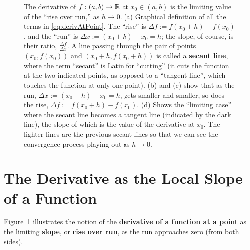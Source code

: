 \begin{figure}[htb]
    \caption[]{The derivative of $f:(a, b) \to \mathbb R$ at $x_0 \in (a, b)$ is the limiting value of the ``rise over run,'' as $h \to 0$. (a) Graphical definition of all the terms in \eqref{eq:derivAtPoint}. The ``rise'' is $\Delta f := f(x_0+h) - f(x_0)$, and the ``run'' is $\Delta x:= (x_0+h) - x_0 = h$; the slope, of course, is their ratio, $\frac{\Delta f}{\Delta x}$. A line passing through the pair of points $(x_0, f(x_0))$ and $(x_0+h, f(x_0 +h))$ is called a \href{https://en.wikipedia.org/wiki/Secant}{\bf secant line}, where the term ``secant'' is Latin for ``cutting'' (it cuts the function at the two indicated points, as opposed to a ``tangent line'', which touches the function at only one point). (b) and (c) show that as the run, $\Delta x := (x_0 + h) - x_0 = h$, gets smaller and smaller, so does the rise, $\Delta f:= f(x_0 +h) - f(x_0)$. (d) Shows the ``limiting case'' where the secant line becomes a tangent line (indicated by the dark line), the slope of which is the value of the derivative at $x_0$. The lighter lines are the previous secant lines so that we can see the convergence process playing out as $h \to 0$.}
    \label{fig:DefDerivativeAtPoint}
\end{figure}

\section{The Derivative as the Local Slope of a Function}

Figure~\ref{fig:DefDerivativeAtPoint} illustrates the notion of the \textbf{derivative of a function at a point} as the limiting \textbf{slope}, or \textbf{rise over run}, as the run approaches zero (from both sides). 

